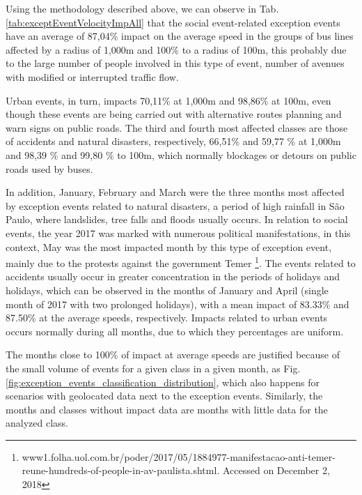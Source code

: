 \documentclass[runningheads]{llncs}
\begin{document}
Using the methodology described above, we can observe in Tab. \ref{tab:exceptEventVelocityImpAll} that the social event-related exception events have an average of 87,04\% impact on the average speed in the groups of bus lines affected by a radius of 1,000m and 100\% to a radius of 100m, this probably due to the large number of people involved in this type of event, number of avenues with modified or interrupted traffic flow.

Urban events, in turn, impacts 70,11\% at 1,000m and 98,86\% at 100m, even though these events are being carried out with alternative routes planning and warn signs on public roads. The third and fourth most affected classes are those of accidents and natural disasters, respectively, 66,51\% and 59,77 \% at 1,000m and 98,39 \% and 99,80 \% to 100m, which normally blockages or detours on public roads used by buses.

In addition, January, February and March were the three months most affected by exception events related to natural disasters, a period of high rainfall in São Paulo, where landslides, tree falls and floods usually occurs. In relation to social events, the year 2017 was marked with numerous political manifestations, in this context, May was the most impacted month by this type of exception event, mainly due to the protests against the government Temer \footnote{{www1.folha.uol.com.br/poder/2017/05/1884977-manifestacao-anti-\newline temer-reune-hundreds-of-people-in-av-paulista.shtml}. Accessed on December 2, 2018}. The events related to accidents usually occur in greater concentration in the periods of holidays and holidays, which can be observed in the months of January and April (single month of 2017 with two prolonged holidays), with a mean impact of 83.33\% and 87.50\% at the average speeds, respectively. Impacts related to urban events occurs normally during all months, due to which they percentages are uniform.

The months close to 100\% of impact at average speeds are justified because of the small volume of events for a given class in a given month, as Fig.\ref{fig:exception_events_classification_distribution}, which also happens for scenarios with geolocated data next to the exception events. Similarly, the months and classes without impact data are months with little data for the analyzed class.
\end{document}
